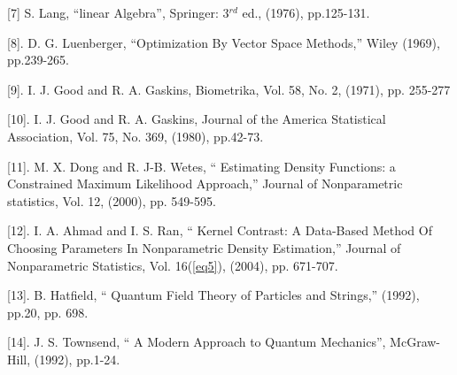 \documentclass [18pt]{article}
\begin{document}
[7] S. Lang, ``linear Algebra'', Springer: 3$^{rd }$ ed., (1976),
pp.125-131.

[8]. D. G. Luenberger, ``Optimization By Vector Space Methods,'' Wiley
(1969), pp.239-265.

[9]. I. J. Good and R. A. Gaskins, Biometrika, Vol. 58, No. 2, (1971), pp.
255-277

[10]. I. J. Good and R. A. Gaskins, Journal of the America Statistical
Association, Vol. 75, No. 369, (1980), pp.42-73.

[11]. M. X. Dong and R. J-B. Wetes, `` Estimating Density Functions: a
Constrained Maximum Likelihood Approach,'' Journal of Nonparametric
statistics, Vol. 12, (2000), pp. 549-595.

[12]. I. A. Ahmad and I. S. Ran, `` Kernel Contrast: A Data-Based Method Of
Choosing Parameters In Nonparametric Density Estimation,'' Journal of
Nonparametric Statistics, Vol. 16(\ref{eq5}), (2004), pp. 671-707.

[13]. B. Hatfield, `` Quantum Field Theory of Particles and Strings,''
(1992), pp.20, pp. 698.

[14]. J. S. Townsend, `` A Modern Approach to Quantum Mechanics'',
McGraw-Hill, (1992), pp.1-24.
\end{document}
